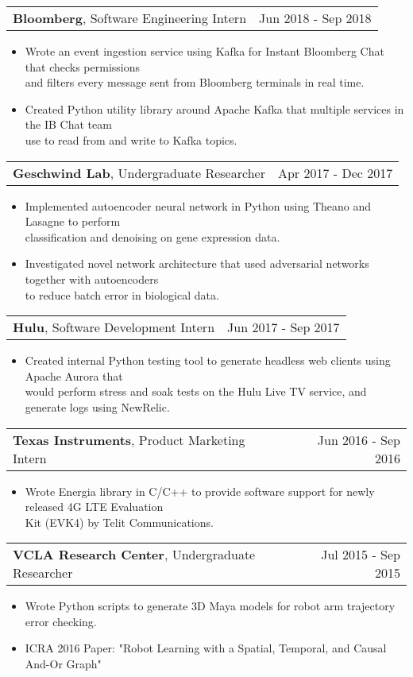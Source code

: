 \documentclass[letterpaper,10.8pt]{article}
\makeatletter
\newcommand{\resumeItemOne}[1]{
  \item[$\circ$]\small{{#1 \vspace{-2pt}}
  }
}
\newcommand{\resumeSubheading}[3]{
  \vspace{-2pt}\item[$ $]
    \begin{tabular*}{0.97\textwidth}{l@{\extracolsep{\fill}}r}
      \textbf{#1}, \small #2 & \small #3 \\
    \end{tabular*}
  \vspace{-7pt}
}
\newcommand{\resumeItemListStart}{\begin{itemize}}
\newcommand{\resumeItemListEnd}{\end{itemize}\vspace{-5pt}}
\makeatother
\begin{document}
    \resumeSubheading
    {Bloomberg}{Software Engineering Intern}{Jun 2018 - Sep 2018}
    \resumeItemListStart
        \resumeItemOne{Wrote an event ingestion service using Kafka for Instant Bloomberg Chat that checks permissions\\and filters every message sent from Bloomberg terminals in real time.}
        \resumeItemOne{Created Python utility library around Apache Kafka that multiple services in the IB Chat team\\use to read from and write to Kafka topics.}
    \resumeItemListEnd
    
    \resumeSubheading
    {Geschwind Lab}{Undergraduate Researcher}{Apr 2017 - Dec 2017}
    \resumeItemListStart
        \resumeItemOne{Implemented autoencoder neural network in Python using Theano and Lasagne to perform\\classification and denoising on gene expression data.}
        \resumeItemOne{Investigated novel network architecture that used adversarial networks together with autoencoders\\to reduce batch error in biological data.}
    \resumeItemListEnd
    
    \resumeSubheading
    {Hulu}{Software Development Intern}{Jun 2017 - Sep 2017}
    \resumeItemListStart
        \resumeItemOne{Created internal Python testing tool to generate headless web clients using Apache Aurora that\\would perform stress and soak tests on the Hulu Live TV service, and generate logs using NewRelic.}
    \resumeItemListEnd
    
    \resumeSubheading
    {Texas Instruments}{Product Marketing Intern}{Jun 2016 - Sep 2016}
    \resumeItemListStart
        \resumeItemOne{Wrote Energia library in C/C++ to provide software support for newly released 4G LTE Evaluation\\Kit (EVK4) by Telit Communications.}
    \resumeItemListEnd
    
    \resumeSubheading
    {VCLA Research Center}{Undergraduate Researcher}{Jul 2015 - Sep 2015}
    \resumeItemListStart
        \resumeItemOne{Wrote Python scripts to generate 3D Maya models for robot arm trajectory error checking.}
        \resumeItemOne{ICRA 2016 Paper: "Robot Learning with a Spatial, Temporal, and Causal And-Or Graph"}
    \resumeItemListEnd
\end{document}

